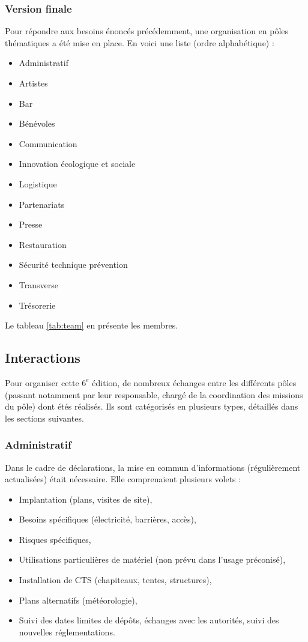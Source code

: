 \documentclass[12pt,a4paper]{report}
\begin{document}
\subsubsection{Version finale}
Pour répondre aux besoins énoncés précédemment, une organisation en pôles thématiques a été mise en place. En voici une liste (ordre alphabétique) : 
\begin{itemize}
\item Administratif
\item Artistes
\item Bar
\item Bénévoles
\item Communication
\item Innovation écologique et sociale
\item Logistique
\item Partenariats
\item Presse
\item Restauration
\item Sécurité technique prévention
\item Transverse
\item Trésorerie
\end{itemize}

Le tableau \ref{tab:team} en présente les membres.

\subsection{Interactions}
Pour organiser cette $6^e$ édition, de nombreux échanges entre les différents pôles (passant notamment par leur responsable, chargé de la coordination des missions du pôle) dont étés réalisés. Ils sont catégorisés en plusieurs types, détaillés dans les sections suivantes.

\subsubsection{Administratif}
Dans le cadre de déclarations, la mise en commun d'informations (régulièrement actualisées) était nécessaire. Elle comprenaient plusieurs volets :
\begin{itemize}
\item Implantation (plans, visites de site),
\item Besoins spécifiques (électricité, barrières, accès),
\item Risques spécifiques,
\item Utilisations particulières de matériel (non prévu dans l'usage préconisé),
\item Installation de CTS (chapiteaux, tentes, structures),
\item Plans alternatifs (météorologie),
\item Suivi des dates limites de dépôts, échanges avec les autorités, suivi des nouvelles réglementations.
\end{itemize}
\end{document}
